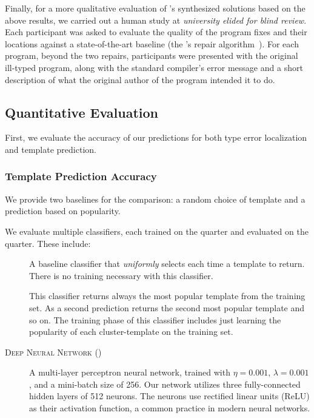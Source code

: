 Finally, for a more qualitative evaluation of \toolname's synthesized solutions
based on the above results, we carried out a human study at \emph{university 
elided for blind review}. Each
participant was asked to evaluate the quality of the program fixes and their
locations against a state-of-the-art
baseline (the \seminal's repair algorithm~\citep{Lerner2006-pj, Lerner2007-dt}). 
For each program, beyond the two repairs, participants were presented with the original
ill-typed program, along with the standard \ocaml compiler's error message and a
short description of what the original author of the program intended it to do.

\subsection{Quantitative Evaluation}
\label{subsec:quan_eval}

First, we evaluate the accuracy of our predictions for both type error
localization and template prediction.


\subsubsection{Template Prediction Accuracy}
\label{subsubsec:templ_acc}

We provide two baselines for the comparison: a random choice of template and a
prediction based on popularity.

We evaluate multiple classifiers, each trained on the \SPRING quarter and evaluated
on the \FALL quarter. These include:
\begin{description}
  \item[\random] A baseline classifier that \emph{uniformly} selects each time a
    template to return. There is no training necessary with this classifier.
  \item[\popular] This classifier returns always the most popular template from
    the training set. As a second prediction returns the second most popular
    template and so on. The training phase of this classifier includes just
    learning the popularity of each cluster-template on the training set.
  \item[\textsc{Deep Neural Network} (\dnn)] A multi-layer perceptron neural
    network, trained with $\eta = 0.001$, $\lambda = 0.001$, and a mini-batch
    size of 256. Our network utilizes three fully-connected hidden layers of 512
    neurons. The neurons use rectified linear units (ReLU) as their activation
    function, a common practice in modern neural networks.
\end{description}


